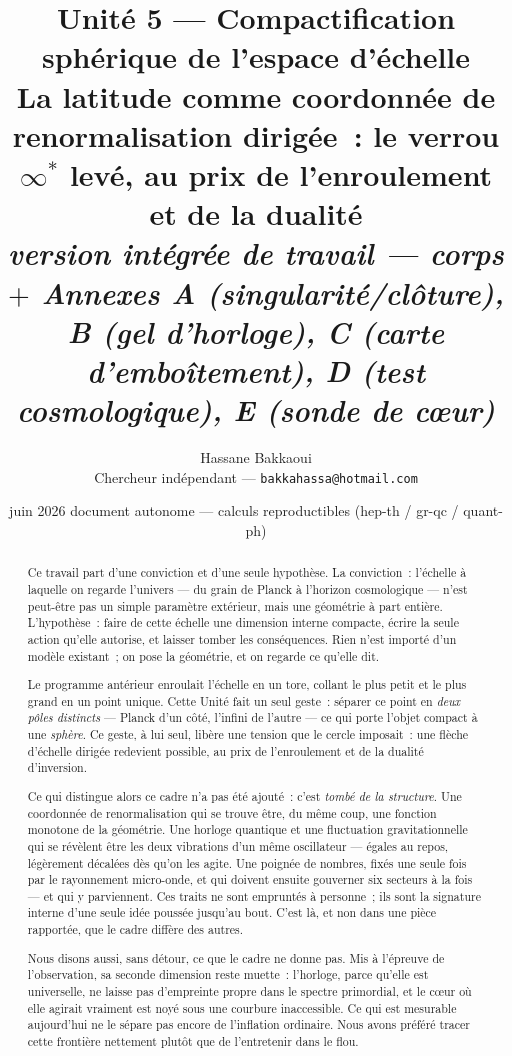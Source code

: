 \documentclass[11pt]{article}
\title{\textbf{Unit\'e 5 --- Compactification sph\'erique de l'espace d'\'echelle}\\[2mm]
\large La latitude comme coordonn\'ee de renormalisation dirig\'ee~: le verrou $\infty^\ast$ lev\'e,
au prix de l'enroulement et de la dualit\'e\\[1mm]
\normalsize\textit{version int\'egr\'ee de travail --- corps $+$ Annexes A (singularit\'e/cl\^oture),
B (gel d'horloge), C (carte d'embo\^itement), D (test cosmologique), E (sonde de c\oe ur)}}
\author{Hassane Bakkaoui\\\small Chercheur ind\'ependant --- \texttt{bakkahassa@hotmail.com}}
\date{\small juin 2026 \;\textbullet\; document autonome --- calculs reproductibles (hep-th / gr-qc / quant-ph)}
\theoremstyle{definition}
\begin{document}
\maketitle

\begin{abstract}
\noindent Ce travail part d'une conviction et d'une seule hypoth\`ese. La conviction~: l'\'echelle \`a
laquelle on regarde l'univers --- du grain de Planck \`a l'horizon cosmologique --- n'est peut-\^etre pas
un simple param\`etre ext\'erieur, mais une g\'eom\'etrie \`a part enti\`ere. L'hypoth\`ese~: faire de
cette \'echelle une dimension interne compacte, \'ecrire la seule action qu'elle autorise, et laisser
tomber les cons\'equences. Rien n'est import\'e d'un mod\`ele existant~; on pose la g\'eom\'etrie, et on
regarde ce qu'elle dit.

\smallskip
\noindent Le programme ant\'erieur enroulait l'\'echelle en un tore, collant le plus petit et le plus grand
en un point unique. Cette Unit\'e fait un seul geste~: s\'eparer ce point en \emph{deux p\^oles distincts}
--- Planck d'un c\^ot\'e, l'infini de l'autre --- ce qui porte l'objet compact \`a une \emph{sph\`ere}. Ce
geste, \`a lui seul, lib\`ere une tension que le cercle imposait~: une fl\`eche d'\'echelle dirig\'ee
redevient possible, au prix de l'enroulement et de la dualit\'e d'inversion.

\smallskip
\noindent Ce qui distingue alors ce cadre n'a pas \'et\'e ajout\'e~: c'est \emph{tomb\'e de la structure}.
Une coordonn\'ee de renormalisation qui se trouve \^etre, du m\^eme coup, une fonction monotone de la
g\'eom\'etrie. Une horloge quantique et une fluctuation gravitationnelle qui se r\'ev\`elent \^etre les
deux vibrations d'un m\^eme oscillateur --- \'egales au repos, l\'eg\`erement d\'ecal\'ees d\`es qu'on les
agite. Une poign\'ee de nombres, fix\'es une seule fois par le rayonnement micro-onde, et qui doivent
ensuite gouverner six secteurs \`a la fois --- et qui y parviennent. Ces traits ne sont emprunt\'es \`a
personne~; ils sont la signature interne d'une seule id\'ee pouss\'ee jusqu'au bout. C'est l\`a, et non
dans une pi\`ece rapport\'ee, que le cadre diff\`ere des autres.

\smallskip
\noindent Nous disons aussi, sans d\'etour, ce que le cadre ne donne pas. Mis \`a l'\'epreuve de
l'observation, sa seconde dimension reste muette~: l'horloge, parce qu'elle est universelle, ne laisse pas
d'empreinte propre dans le spectre primordial, et le c\oe ur o\`u elle agirait vraiment est noy\'e sous une
courbure inaccessible. Ce qui est mesurable aujourd'hui ne le s\'epare pas encore de l'inflation ordinaire.
Nous avons pr\'ef\'er\'e tracer cette fronti\`ere nettement plut\^ot que de l'entretenir dans le flou.


\end{abstract}
\end{document}
